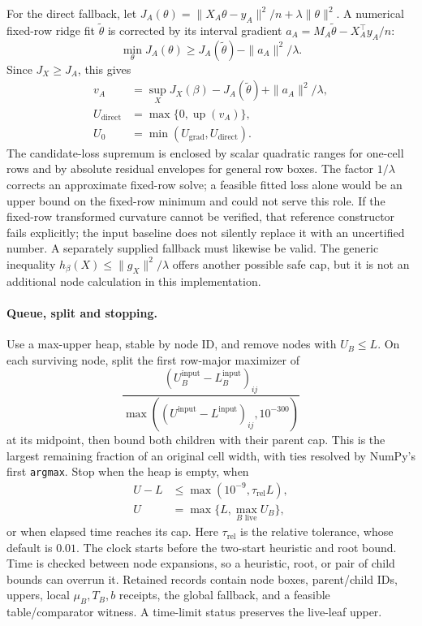 For the direct fallback, let $J_A(\theta)=\|X_A\theta-y_A\|^2/n+\lambda\|\theta\|^2$. A numerical fixed-row ridge fit $\widetilde\theta$ is corrected by its interval gradient $a_A=M_A\widetilde\theta-X_A^\top y_A/n$:
\[
 \min_\theta J_A(\theta)\geq
 J_A(\widetilde\theta)-\|a_A\|^2/\lambda.
\]
Since $J_X\geq J_A$, this gives
\begin{align*}
 v_A&=\sup_XJ_X(\beta)-J_A(\widetilde\theta)+\|a_A\|^2/\lambda,\\
 U_{\mathrm{direct}}&=\max\{0,\operatorname{up}(v_A)\},\\
 U_0&=\min(U_{\mathrm{grad}},U_{\mathrm{direct}}).
\end{align*}
The candidate-loss supremum is enclosed by scalar quadratic ranges for one-cell rows and by absolute residual envelopes for general row boxes. The factor $1/\lambda$ corrects an approximate fixed-row solve; a feasible fitted loss alone would be an upper bound on the fixed-row minimum and could not serve this role. If the fixed-row transformed curvature cannot be verified, that reference constructor fails explicitly; the input baseline does not silently replace it with an uncertified number. A separately supplied fallback must likewise be valid. The generic inequality $h_\beta(X)\leq\|g_X\|^2/\lambda$ offers another possible safe cap, but it is not an additional node calculation in this implementation.

\paragraph{Queue, split and stopping.}
Use a max-upper heap, stable by node ID, and remove nodes with $U_B\leq L$. On each surviving node, split the first row-major maximizer of
\[
 \frac{(U_B^{\mathrm{input}}-L_B^{\mathrm{input}})_{ij}}
 {\max((U^{\mathrm{input}}-L^{\mathrm{input}})_{ij},10^{-300})}
\]
at its midpoint, then bound both children with their parent cap. This is the largest remaining fraction of an original cell width, with ties resolved by NumPy's first \texttt{argmax}. Stop when the heap is empty, when
\begin{align*}
 U-L&\leq\max(10^{-9},\tau_{\mathrm{rel}}L),\\
 U&=\max\{L,\max_{B\text{ live}}U_B\},
\end{align*}
or when elapsed time reaches its cap. Here $\tau_{\mathrm{rel}}$ is the relative tolerance, whose default is $0.01$. The clock starts before the two-start heuristic and root bound. Time is checked between node expansions, so a heuristic, root, or pair of child bounds can overrun it. Retained records contain node boxes, parent/child IDs, uppers, local $\mu_B,T_B,b$ receipts, the global fallback, and a feasible table/comparator witness. A time-limit status preserves the live-leaf upper.


